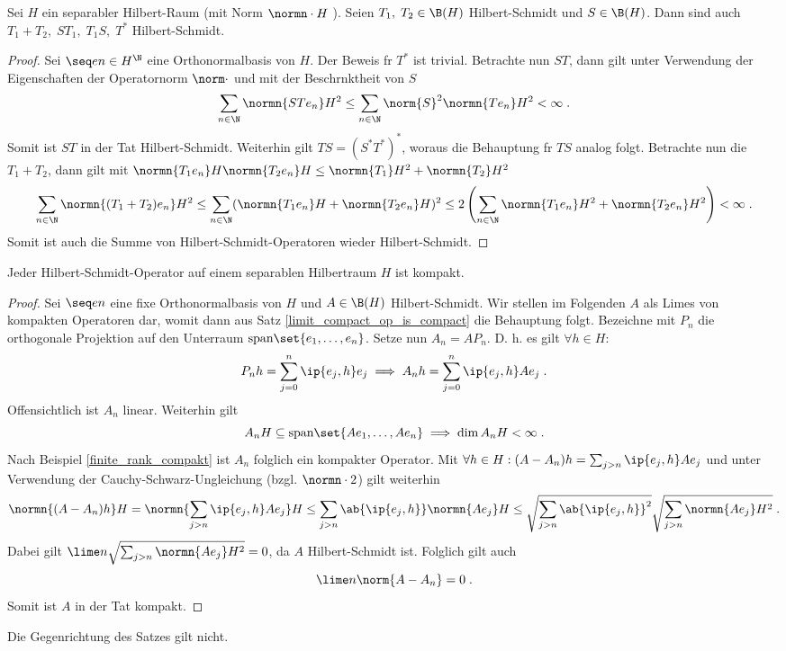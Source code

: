 \begin{theorem}
	Sei \(H\) ein separabler Hilbert-Raum (mit Norm \(\normn\cdot H\) ). Seien \(T_1, \;T_2\in \B(H) \) Hilbert-Schmidt und \(S\in \B(H)\). Dann sind auch \(T_1 + T_2,\; ST_1,\; T_1S,\; T^*\) Hilbert-Schmidt.
\end{theorem}
\begin{proof}
	Sei \(\seq en \in H^\N\) eine Orthonormalbasis von $H$.
	Der Beweis f\us r \(T^*\) ist trivial. Betrachte nun \(ST\), dann gilt unter Verwendung der Eigenschaften der Operatornorm \(\norm\cdot\) und mit der Beschr\as nktheit von $S$
	\[\sum_{n\in\N} \normn{STe_n}H^2 \leq \sum_{n\in\N} \norm{S}^2  \normn{Te_n}H^2 < \infty \;.\]
	Somit ist \(ST\) in der Tat Hilbert-Schmidt. Weiterhin gilt \(TS = (S^* T^*)^*\), woraus die Behauptung f\us r $TS$ analog folgt. Betrachte nun die \(T_1 + T_2\), dann gilt mit \(\normn{T_1 e_n}H \normn{T_2 e_n}H \leq \normn{T_1}H^2 + \normn{T_2}H^2\)
	\[\sum_{n\in\N} \normn{(T_1 + T_2)e_n}H^2 \leq \sum_{n\in\N} (\normn{T_1 e_n}H + \normn{T_2 e_n}H)^2 \leq 2 \left(\sum_{n\in\N} \normn{T_1 e_n}H^2 + \normn{T_2 e_n}H^2\right) < \infty\;.\]
	Somit ist auch die Summe von Hilbert-Schmidt-Operatoren wieder Hilbert-Schmidt.
\end{proof}

\begin{theorem}
	Jeder Hilbert-Schmidt-Operator auf einem separablen Hilbertraum $H$ ist kompakt.
\end{theorem}
\begin{proof}
	Sei \(\seq en\) eine fixe Orthonormalbasis von $H$ und \(A\in \B(H)\) Hilbert-Schmidt. Wir stellen im Folgenden \(A\) als Limes von kompakten Operatoren dar, womit dann aus Satz \ref{limit_compact_op_is_compact} die Behauptung folgt. 
	Bezeichne mit \(P_n\) die orthogonale Projektion auf den Unterraum \(\text{span}\set{e_1,\ldots,e_n}\). Setze nun \(A_n = A P_n\). D. h. es gilt \(\forall h \in H\):
	\[P_n h = \sum_{j=0}^n \ip{e_j, h} e_j \implies A_n h = \sum_{j=0}^n \ip{e_j, h} Ae_j\;.\]
	Offensichtlich ist \(A_n\) linear. Weiterhin gilt
	\[A_n H \subseteq \text{span}\set{Ae_1,\ldots,Ae_n} \implies \dim A_n H < \infty\;.\]
	Nach Beispiel \ref{finite_rank_compakt} ist \(A_n\) folglich ein kompakter Operator.
	Mit \(\forall h \in H: (A-A_n)h = \sum_{j>n}\ip{e_j, h}Ae_j\) und unter Verwendung der Cauchy-Schwarz-Ungleichung (bzgl. \(\normn\cdot 2\)) gilt weiterhin
	\[\normn{(A-A_n)h}H = \normn{\sum_{j>n}\ip{e_j, h}Ae_j}H \leq \sum_{j>n} \ab{\ip{e_j, h}} \normn{Ae_j}H \leq \sqrt{\sum_{j>n} \ab{\ip{e_j, h}}^2} \sqrt{\sum_{j>n}\normn{Ae_j}H^2}\;.\]
	Dabei gilt \(\lime n  \sqrt{\sum_{j>n}\normn{Ae_j}H^2} = 0\), da $A$ Hilbert-Schmidt ist. Folglich gilt auch
	\[\lime n \norm{A-A_n} = 0\;.\]
	Somit ist $A$ in der Tat kompakt.
\end{proof}
\begin{rem}
	Die Gegenrichtung des Satzes gilt nicht.
\end{rem}


